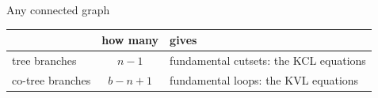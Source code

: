 \documentclass[11pt,aspectratio=169]{beamer}
\begin{document}
\begin{frame}{Any connected graph}
  \vfill
  \begin{center}
    \renewcommand{\arraystretch}{1.3}
    \begin{tabular}{@{}l c l@{}}
      \toprule
       & how many & gives\\
      \midrule
      tree branches   & $n - 1$     & fundamental cutsets: the KCL equations\\
      co-tree branches & $b - n + 1$ & fundamental loops: the KVL equations\\
      \bottomrule
    \end{tabular}
  \end{center}
  \vfill
  \begin{center}
  \end{center}
  \vfill
\end{frame}
\end{document}
